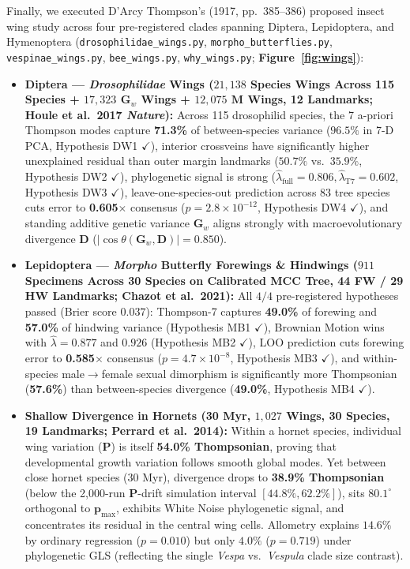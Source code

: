 \documentclass[10pt,twocolumn]{article}
\begin{document}
Finally, we executed D'Arcy Thompson's (1917, pp.~385--386) proposed insect wing study across four pre-registered clades spanning Diptera, Lepidoptera, and Hymenoptera (\texttt{drosophilidae\_wings.py}, \texttt{morpho\_butterflies.py}, \texttt{vespinae\_wings.py}, \texttt{bee\_wings.py}, \texttt{why\_wings.py}; \textbf{Figure~\ref{fig:wings}}):
\begin{itemize}
  \item \textbf{Diptera — \emph{Drosophilidae} Wings ($21{,}138$ Species Wings Across 115 Species + $17{,}323$ $\mathbf{G}_w$ Wings + $12{,}075$ $\mathbf{M}$ Wings, 12 Landmarks; Houle et al.\ 2017 \emph{Nature}):} Across 115 drosophilid species, the 7 a-priori Thompson modes capture \textbf{71.3\%} of between-species variance ($96.5\%$ in 7-D PCA, Hypothesis DW1 $\checkmark$), interior crossveins have significantly higher unexplained residual than outer margin landmarks ($50.7\%$ vs.\ $35.9\%$, Hypothesis DW2 $\checkmark$), phylogenetic signal is strong ($\hat{\lambda}_{\text{full}} = 0.806, \hat{\lambda}_{\text{T7}} = 0.602$, Hypothesis DW3 $\checkmark$), leave-one-species-out prediction across 83 tree species cuts error to \textbf{0.605$\times$} consensus ($p = 2.8\times 10^{-12}$, Hypothesis DW4 $\checkmark$), and standing additive genetic variance $\mathbf{G}_w$ aligns strongly with macroevolutionary divergence $\mathbf{D}$ ($|\cos\theta(\mathbf{G}_w, \mathbf{D})| = \mathbf{0.850}$).
  \item \textbf{Lepidoptera — \emph{Morpho} Butterfly Forewings \& Hindwings ($911$ Specimens Across 30 Species on Calibrated MCC Tree, 44 FW / 29 HW Landmarks; Chazot et al.\ 2021):} All $4/4$ pre-registered hypotheses passed (Brier score $\mathbf{0.037}$): Thompson-7 captures \textbf{49.0\%} of forewing and \textbf{57.0\%} of hindwing variance (Hypothesis MB1 $\checkmark$), Brownian Motion wins with $\hat{\lambda} = 0.877$ and $0.926$ (Hypothesis MB2 $\checkmark$), LOO prediction cuts forewing error to \textbf{0.585$\times$} consensus ($p = 4.7\times 10^{-8}$, Hypothesis MB3 $\checkmark$), and within-species male$\to$female sexual dimorphism is significantly more Thompsonian (\textbf{57.6\%}) than between-species divergence (\textbf{49.0\%}, Hypothesis MB4 $\checkmark$).
  \item \textbf{Shallow Divergence in Hornets (30 Myr, $1{,}027$ Wings, 30 Species, 19 Landmarks; Perrard et al.\ 2014):} Within a hornet species, individual wing variation ($\mathbf{P}$) is itself \textbf{54.0\% Thompsonian}, proving that developmental growth variation follows smooth global modes. Yet between close hornet species (30 Myr), divergence drops to \textbf{38.9\% Thompsonian} (below the 2,000-run $\mathbf{P}$-drift simulation interval $[44.8\%, 62.2\%]$), sits $80.1^\circ$ orthogonal to $\mathbf{p}_{\max}$, exhibits White Noise phylogenetic signal, and concentrates its residual in the central wing cells. Allometry explains $14.6\%$ by ordinary regression ($p = 0.010$) but only $4.0\%$ ($p = 0.719$) under phylogenetic GLS (reflecting the single \emph{Vespa} vs.\ \emph{Vespula} clade size contrast).

\end{itemize}
\end{document}
